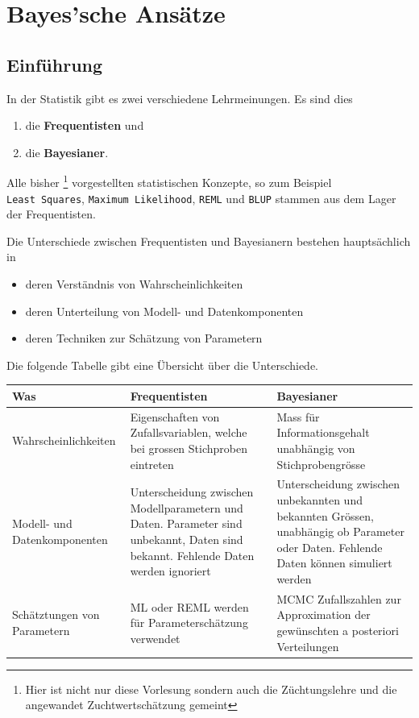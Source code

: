 \documentclass[]{book}
\providecommand{\tightlist}{%
  \setlength{\itemsep}{0pt}\setlength{\parskip}{0pt}}
\let\rmarkdownfootnote\footnote%
\def\footnote{\protect\rmarkdownfootnote}
\begin{document}
\chapter{Bayes'sche Ansätze}\label{bayes}

\section{Einführung}\label{einfuhrung}

In der Statistik gibt es zwei verschiedene Lehrmeinungen. Es sind dies

\begin{enumerate}
\def\labelenumi{\arabic{enumi}.}
\tightlist
\item
  die \textbf{Frequentisten} und
\item
  die \textbf{Bayesianer}.
\end{enumerate}

Alle bisher
\footnote{Hier ist nicht nur diese Vorlesung sondern auch die Züchtungslehre und die angewandet Zuchtwertschätzung gemeint}
vorgestellten statistischen Konzepte, so zum Beispiel
\texttt{Least\ Squares}, \texttt{Maximum\ Likelihood}, \texttt{REML} und
\texttt{BLUP} stammen aus dem Lager der Frequentisten.

Die Unterschiede zwischen Frequentisten und Bayesianern bestehen
hauptsächlich in

\begin{itemize}
\tightlist
\item
  deren Verständnis von Wahrscheinlichkeiten
\item
  deren Unterteilung von Modell- und Datenkomponenten
\item
  deren Techniken zur Schätzung von Parametern
\end{itemize}

Die folgende Tabelle gibt eine Übersicht über die Unterschiede.

\begin{tabular}{p{3cm}p{6cm}p{6cm}}
\hline
Was                            &  Frequentisten  &  Bayesianer \\
\hline
Wahrscheinlichkeiten           &  Eigenschaften von Zufallsvariablen, welche bei grossen Stichproben eintreten
                               &  Mass für Informationsgehalt unabhängig von Stichprobengrösse \\
Modell- und Datenkomponenten   &  Unterscheidung zwischen Modellparametern und Daten. Parameter sind unbekannt, Daten sind bekannt. Fehlende Daten werden ignoriert
                               &  Unterscheidung zwischen unbekannten und bekannten Grössen, unabhängig ob Parameter oder Daten. Fehlende Daten können simuliert werden \\
Schätztungen von Parametern    &  ML oder REML werden für Parameterschätzung verwendet
                               &  MCMC Zufallszahlen zur Approximation der gewünschten a posteriori Verteilungen \\
\hline
\end{tabular}
\end{document}
